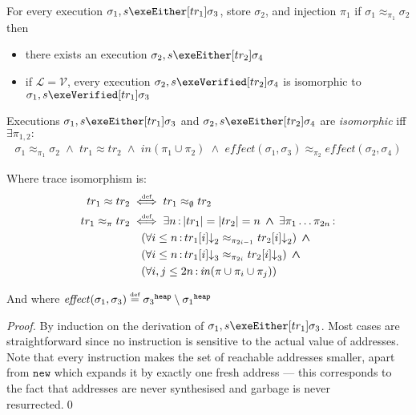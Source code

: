 \documentclass[runningheads,a4paper]{llncs}
\DeclareMathOperator{\band}{\bm{\;\land\;}}
\DeclareMathOperator{\suchthat}{:}
\newcommand*{\qvars}[2]{#1_{#2}}
\newcommand*{\cardinality}[1]{\left|{#1}\right|}
\newcommand*{\defeq}{\stackrel{\text{\tiny def}}{=}}
\newcommand*{\defiff}{\stackrel{\text{\tiny def}}{\iff}}
\newcommand*{\evalat}{{\downarrow}}
\newcommand*{\news}{\texttt{new}}
\newcommand{\tr}{tr}
\newcommand*\iso{\approx}
\newcommand*\Lsemantics{\mathcal{L}}
\newcommand*\Vsemantics{\mathcal{V}}
\newcommand{\diff}{\mathit{effect}}
\newcommand*{\bijection}[1]{\mathit{in}{\left(#1\right)}}
\newcommand*{\store}{\sigma}
\newcommand*{\heapof}[1]{{#1}^{\mathtt{heap}}}
\begin{document}
\begin{lemma}\label{lem:closed under isomorphism}\setlength{\parindent}{0cm}

For every execution $\store_1,s\exeEither[\tr_1]\store_3$, store $\store_2$, and injection $\pi_1$ if $\store_1 \iso_{\pi_1} \store_2$ then
\begin{itemize}
	\item there exists an execution $\store_2,s\exeEither[\tr_2]\store_4$
	\item if $\Lsemantics{}=\Vsemantics{}$, every execution $\store_2,s\exeVerified[\tr_2]\store_4$ is isomorphic to $\store_1,s\exeVerified[\tr_1]\store_3$
\end{itemize}

Executions $\store_1,s\exeEither[\tr_1]\store_3$ and $\store_2,s\exeEither[\tr_2]\store_4$ are \emph{isomorphic} iff $\exists \qvars{\pi}{1,2} \suchthat$
\[\begin{aligned}
\store_1 \iso_{\pi_1} \store_2 \band
  	\tr_1 \iso \tr_2 \band
	\bijection{\pi_1\cup\pi_2} \band
	\diff(\store_1,\store_3) \iso_{\pi_2} \diff(\store_2,\store_4)
\end{aligned}\]

Where trace isomorphism is:
\[\begin{aligned}
\tr_1 \iso \tr_2 &\defiff \tr_1 \iso_\emptyset \tr_2 \\
\tr_1 \iso_\pi \tr_2 &\defiff \exists n \suchthat
	\cardinality{\tr_1}=\cardinality{\tr_2}=n \band \exists \pi_1\ldots\pi_{2n}\suchthat \\
&\quad	(\forall i \le n \suchthat \tr_1[i]\evalat_{2}\iso_{\pi_{2i-1}}\tr_2[i]\evalat_{2}) \band \\
&\quad	(\forall i \le n \suchthat \tr_1[i]\evalat_{3}\iso_{\pi_{2i}}\tr_2[i]\evalat_{3}) \band \\
&\quad	(\forall i,j \le 2n \suchthat \bijection{\pi \cup \pi_i \cup \pi_j})
\end{aligned}\]

And where $\diff(\store_1,\store_3) \defeq \heapof{\store_3} \setminus \heapof{\store_1}$
\end{lemma}
\begin{proof}By induction on the derivation of $\store_1,s\exeEither[\tr_1]\store_3$. Most cases are straightforward since no instruction is sensitive to the actual value of addresses. Note that every instruction makes the set of reachable addresses smaller, apart from $\news$ which expands it by exactly one fresh address --- this corresponds to the fact that addresses are never synthesised and garbage is never resurrected.\qed\end{proof}
\end{document}
